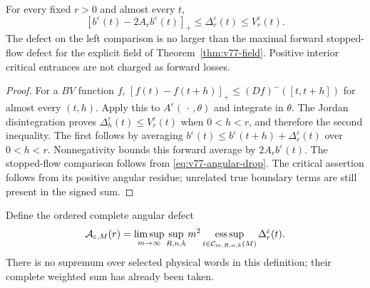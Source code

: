 \begin{theorem}
\label{thm:v77-persistence}
For every fixed $r>0$ and almost every $t$,
\begin{equation}\label{eq:v77-persistence}
 [b^\varepsilon(t)-2A_r b^\varepsilon(t)]_+
                 \le\Delta_r^\varepsilon(t)\le V_r^\varepsilon(t).
\end{equation}
The defect on the left comparison is no larger than the maximal
forward stopped-flow defect for the explicit field of
Theorem~\ref{thm:v77-field}. Positive interior critical entrances
are not charged as forward losses.
\end{theorem}
\begin{proof}
For a $BV$ function $f$,
$[f(t)-f(t+h)]_+\le(Df)^-([t,t+h])$ for almost every $(t,h)$.
Apply this to $A^\varepsilon(\,\cdot\,,\theta)$ and integrate in
$\theta$. The Jordan disintegration proves
$\Delta_h^\varepsilon(t)\le V_r^\varepsilon(t)$ when $0<h<r$,
and therefore the second inequality. The first follows by averaging
$b^\varepsilon(t)\le b^\varepsilon(t+h)+\Delta_r^\varepsilon(t)$
over $0<h<r$. Nonnegativity bounds this forward average by
$2A_r b^\varepsilon(t)$. The stopped-flow comparison follows
from \eqref{eq:v77-angular-drop}. The critical assertion follows
from its positive angular residue; unrelated true boundary terms
are still present in the signed sum.
\end{proof}

Define the ordered complete angular defect
\begin{equation}\label{eq:v77-ordered-defect}
 \mathcal A_{\varepsilon,M}(r)=
 \limsup_{m\to\infty}\sup_{R,n,k}m^2
       \esssup_{t\in\mathcal C_{m,R,n,k}(M)}\Delta_r^\varepsilon(t).
\end{equation}
There is no supremum over selected physical words in this definition;
their complete weighted sum has already been taken.

